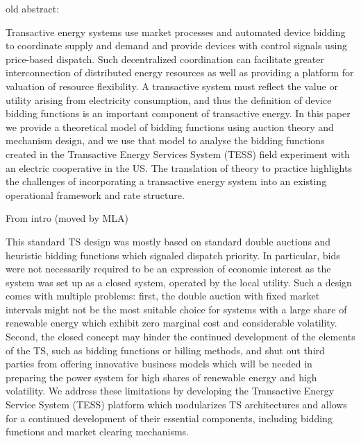 old abstract:

Transactive energy systems use market processes and automated device bidding to coordinate supply and demand and provide devices with control signals using price-based dispatch. Such decentralized coordination can facilitate greater interconnection of distributed energy resources as well as providing a platform for valuation of resource flexibility. A transactive system must reflect the value or utility arising from electricity consumption, and thus the definition of device bidding functions is an important component of transactive energy. In this paper we provide a theoretical model of bidding functions using auction theory and mechanism design, and we use that model to analyse the bidding functions created in the Transactive Energy Services System (TESS) field experiment with an electric cooperative in the US. The translation of theory to practice highlights the challenges of incorporating a transactive energy system into an existing operational framework and rate structure.



From intro (moved by MLA)

This standard TS design was mostly based on standard double auctions and heuristic bidding functions which signaled dispatch priority. In particular, bids were not necessarily required to be an expression of economic interest as the system was set up as a closed system, operated by the local utility.
Such a design comes with multiple problems: first, the double auction with fixed market intervals might not be the most suitable choice for systems with a large share of renewable energy which exhibit zero marginal cost and considerable volatility. Second, the closed concept may hinder the continued development of the elements of the TS, such as bidding functions or billing methods, and shut out third parties from offering innovative business models which will be needed in preparing the power system for high shares of renewable energy and high volatility.
We address these limitations by developing the Transactive Energy Service System (TESS) platform which modularizes TS architectures and allows for a continued development of their essential components, including bidding functions and market clearing mechanisms.

